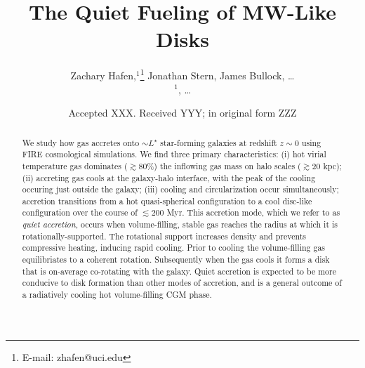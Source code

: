 \documentclass[fleqn,usenatbib]{mnras}
\title[Quiet Accretion onto $L^*$ Galaxies]{The Quiet Fueling of MW-Like Disks}
\author[Hafen, Stern, Bullock et al.]{
Zachary Hafen,$^{1}$\thanks{E-mail: zhafen@uci.edu}
Jonathan Stern,
James Bullock,
\ldots
\\
$^1$,
\ldots
}
\date{Accepted XXX. Received YYY; in original form ZZZ}
\begin{document}
\label{firstpage}
\pagerange{\pageref{firstpage}--\pageref{lastpage}}
\maketitle

\begin{abstract}
We study how gas accretes onto $\sim L^\star$ star-forming galaxies at redshift $z\sim0$ using FIRE cosmological simulations.
We find three primary characteristics:
(i) hot virial temperature gas dominates ($\gtrsim80\%$) the inflowing gas mass on halo scales ($\gtrsim 20$ kpc);
(ii) accreting gas cools at the galaxy-halo interface, with the peak of the cooling occuring just outside the galaxy;
(iii) cooling and circularization occur simultaneously; accretion transitions from a hot quasi-spherical configuration to a cool disc-like configuration over the course of $\lesssim 200$ Myr.
This accretion mode, which we refer to as \textit{quiet accretion}, occurs when volume-filling, stable gas reaches the radius at which it is rotationally-supported.
The rotational support increases density and prevents compressive heating, inducing rapid cooling.
Prior to cooling the volume-filling gas equilibriates to a coherent rotation.
Subsequently when the gas cools it forms a disk that is on-average co-rotating with the galaxy.
Quiet accretion is expected to be more conducive to disk formation than other modes of accretion, and is a general outcome of a radiatively cooling hot volume-filling CGM phase.
\end{abstract}
\end{document}
